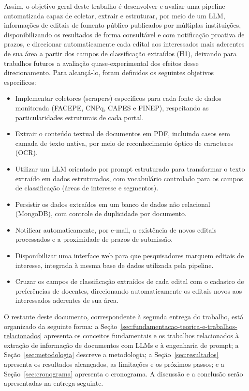 \documentclass[12pt]{article}
\begin{document}
  Assim, o objetivo geral deste trabalho é desenvolver e avaliar uma pipeline automatizada capaz de coletar, extrair e estruturar, por meio de um LLM, informações de editais de fomento público publicados por múltiplas instituições, disponibilizando os resultados de forma consultável e com notificação proativa de prazos, e direcionar automaticamente cada edital aos interessados mais aderentes de sua área a partir dos campos de classificação extraídos (H1), deixando para trabalhos futuros a avaliação quase-experimental dos efeitos desse direcionamento. Para alcançá-lo, foram definidos os seguintes objetivos específicos:
  \begin{itemize}
  \item Implementar coletores (scrapers) específicos para cada fonte de dados monitorada (FACEPE, CNPq, CAPES e FINEP), respeitando as particularidades estruturais de cada portal.
  \item Extrair o conteúdo textual de documentos em PDF, incluindo casos sem camada de texto nativa, por meio de reconhecimento óptico de caracteres (OCR).
  \item Utilizar um LLM orientado por prompt estruturado para transformar o texto extraído em dados estruturados, com vocabulário controlado para os campos de classificação (áreas de interesse e segmentos).
  \item Persistir os dados extraídos em um banco de dados não relacional (MongoDB), com controle de duplicidade por documento.
  \item Notificar automaticamente, por e-mail, a existência de novos editais processados e a proximidade de prazos de submissão.
  \item Disponibilizar uma interface web para que pesquisadores marquem editais de interesse, integrada à mesma base de dados utilizada pela pipeline.
  \item Cruzar os campos de classificação extraídos de cada edital com o cadastro de preferências de docentes, direcionando automaticamente os editais novos aos interessados aderentes de sua área.
  \end{itemize}

  O restante deste documento, correspondente à segunda entrega do trabalho, está organizado da seguinte forma: a Seção~\ref{sec:fundamentacao-teorica-e-trabalhos-relacionados} apresenta os conceitos fundamentais e os trabalhos relacionados à extração de informação de documentos com LLMs e à engenharia de prompt; a Seção~\ref{sec:metodologia} descreve a metodologia; a Seção~\ref{sec:resultados} apresenta os resultados alcançados, as limitações e os próximos passos; e a Seção~\ref{sec:cronograma} apresenta o cronograma. A discussão e a conclusão serão apresentadas na entrega seguinte.
\end{document}
